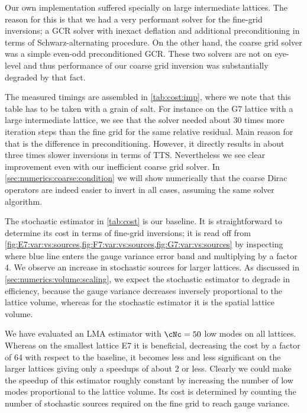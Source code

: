 Our own implementation suffered specially on large intermediate lattices.
The reason for this is that we had a very performant solver for the fine-grid inversions; a GCR solver with inexact deflation and additional preconditioning in terms of Schwarz-alternating procedure.
On the other hand, the coarse grid solver was a simple even-odd preconditioned GCR.
These two solvers are not on eye-level and thus performance of our coarse grid inversion was substantially degraded by that fact.

The measured timings are assembled in \cref{tab:cost:imp}, where we note that this table has to be taken with a grain of salt.
For instance on the G7 lattice with a large intermediate  lattice, we see that the  solver needed about \num{30} times more iteration steps than the fine grid  for the same relative residual.
Main reason for that is the difference in preconditioning.
However, it directly results in about three times slower inversions in terms of TTS.
Nevertheless we see clear improvement even with our inefficient coarse grid solver.
In \cref{sec:numerics:coarse:condition} we will show numerically that the coarse Dirac operators are indeed easier to invert in all cases, assuming the same solver algorithm.

The stochastic estimator in \cref{tab:cost} is our baseline.
It is straightforward to determine its cost in terms of fine-grid inversions; it is read off from \cref{fig:E7:var:vs:sources,fig:F7:var:vs:sources,fig:G7:var:vs:sources} by inspecting where blue line enters the gauge variance error band and multiplying by a factor \num{4}.
We observe an increase in stochastic sources for larger lattices.
As discussed in \cref{sec:numerics:volume:scaling}, we expect the stochastic estimator to degrade in efficiency, because the gauge variance decreases inversely proportional to the lattice volume, whereas for the stochastic estimator it is the spatial lattice volume.

We have evaluated an LMA estimator with $\cNc=50$ low modes on all lattices.
Whereas on the smallest lattice E7 it is beneficial, decreasing the cost by a factor of \num{64} with respect to the baseline, it becomes less and less significant on the larger lattices giving only a speedups of about \num{2} or less.
Clearly we could make the speedup of this estimator roughly constant by increasing the number of low modes proportional to the lattice volume.
Its cost is determined by counting the number of stochastic sources required on the fine grid to reach gauge variance.

